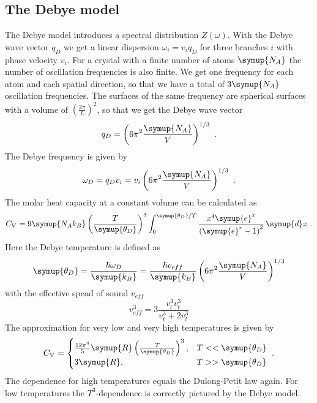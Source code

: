 \subsection{The Debye model}
\label{sec:debye}
The Debye model introduces a spectral distribution $Z(\omega)$. With the Debye wave vector $q_D$ we get a linear dispersion
$\omega_i = v_i q_D$ for three branches $i$ with phase velocity $v_i$. For a crystal with a finite number of atoms $\symup{N_A}$ the 
number of oscillation frequencies is also finite. We get one frequency for each atom and each spatial direction, so that we have a total 
of $3\symup{N_A}$ oscillation frequencies. The surfaces of the same frequency are spherical surfaces with a volume of $\left(\frac{2\pi}{L}\right)^2$, 
so that we get the Debye wave vector 
\begin{equation*}
    q_D = \left(6\pi^2\frac{\symup{N_A}}{V}\right)^{1/3} \,\,. 
\end{equation*}
The Debye frequency is given by 
\begin{equation*}
    \omega_D = q_D v_i = v_i \left(6\pi^2 \frac{\symup{N_A}}{V}\right)^{1/3} \,\, .
\end{equation*}
The molar heat capacity at a constant volume can be calculated as 
\begin{equation*}
    C_V = 9\symup{N_A k_B}\left(\frac{T}{\symup{\theta_D}}\right)^3 \int_{0}^{\symup{\theta_D}/T}\frac{x^4\symup{e}^x}{\left(\symup{e}^x-1\right)^2}\, \symup{d}x \,\, .
\end{equation*}
Here the Debye temperature is defined as
\begin{equation}
    \symup{\theta_D} = \frac{\hbar \omega_D}{\symup{k_B}} = \frac{\hbar v_{eff}}{\symup{k_B}}\left(6\pi^2\frac{\symup{N_A}}{V}\right)^{1/3}
    \label{eqn:theoDebye}
\end{equation}
with the effective spead of sound $v_{eff}$ \
\begin{equation*}
    v_{eff}^3 = 3 \frac{v_l^3 v_t^3}{v_t^3 + 2v_l^3}
\end{equation*}
The approximation for very low and very high temperatures is given by 
\begin{equation*}
    C_V = 
    \begin{cases}
        \frac{12\pi^4}{5}\symup{R}\left(\frac{T}{\symup{\theta_D}}\right)^3 , & T << \symup{\theta_D} \\
        3\symup{R} , & T>> \symup{\theta_D}
    \end{cases}
    \,\, .
\end{equation*}
The dependence for high temperatures equals the Dulong-Petit law again. For low temperatures the $T^3$-dependence is correctly pictured by 
the Debye model.

